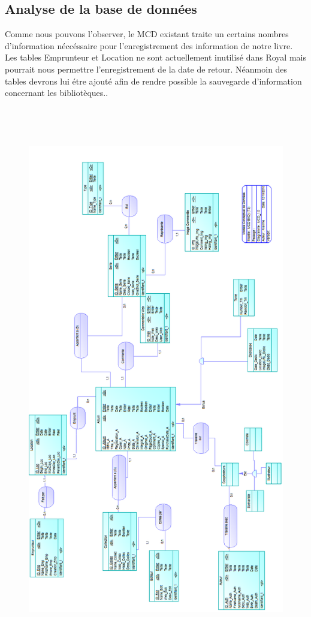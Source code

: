 \subsection{Analyse de la base de données}

Comme nous pouvons l'observer, le MCD existant traite un certains nombres d'information néccéssaire pour l'enregistrement des information de notre livre.
Les tables Emprunteur et Location ne sont actuellement inutilisé dans Royal mais pourrait nous permettre l'enregistrement de la date de retour.
Néanmoin des tables devrons lui étre ajouté afin de rendre possible la sauvegarde d'information concernant les bibliotèques.. 


\begin{figure}[hp]
 \centering
 \includegraphics[height=24cm]{../img/MCD_Royal.png}
\end{figure}

